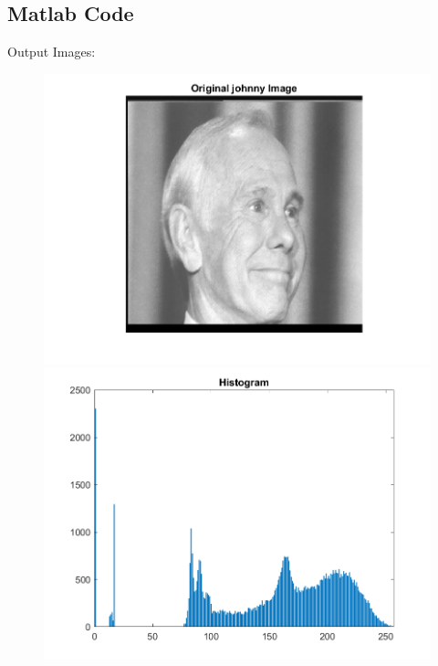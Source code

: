 \documentclass[11pt]{article} %
\begin{document}
\subsection*{Matlab Code}

Output Images:
\begin{figure}
 \centering
\includegraphics{Original_Johny_Image.png}
\includegraphics{Johny_Hist.png}
\end{figure}
\end{document}
